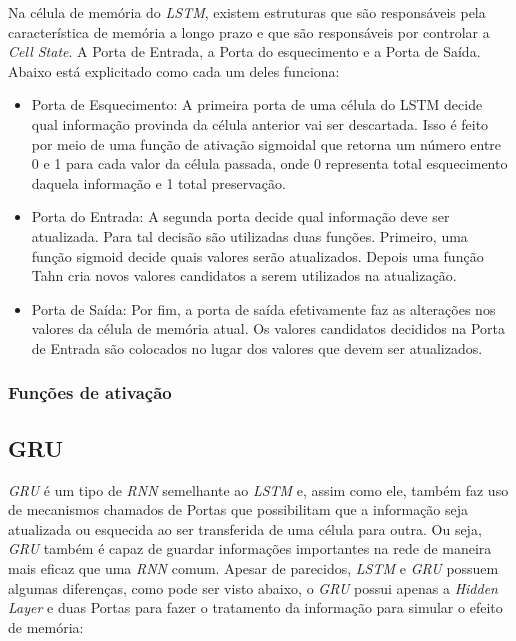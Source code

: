 Na célula de memória do \textit{\acrshort{LSTM}}, existem estruturas que são responsáveis pela característica de memória a longo prazo e que são responsáveis por controlar a \textit{Cell State}. A Porta de Entrada, a Porta do esquecimento e a Porta de Saída. Abaixo está explicitado como cada um deles funciona:
\begin{itemize}
  \item Porta de Esquecimento: A primeira porta de uma célula do \acrfull{LSTM} decide qual informação provinda da célula anterior vai ser descartada. Isso é feito por meio de uma função de ativação sigmoidal que retorna um número entre 0 e 1 para cada valor da célula passada, onde 0 representa total esquecimento daquela informação e 1 total preservação.
  
  \item Porta do Entrada: A segunda porta decide qual informação deve ser atualizada. Para tal decisão são utilizadas duas funções. Primeiro, uma função sigmoid decide quais valores serão atualizados. Depois uma função Tahn cria novos valores candidatos a serem utilizados na atualização.
  \item Porta de Saída: Por fim, a porta de saída efetivamente faz as alterações nos valores da célula de memória atual. Os valores candidatos decididos na Porta de Entrada são colocados no lugar dos valores que devem ser atualizados.
\end{itemize}


\subsubsection{Funções de ativação}

\subsection{\acrfull{GRU}}


\textit{\acrshort{GRU}} é um tipo de \textit{\acrshort{RNN}} semelhante ao \textit{\acrshort{LSTM}} e, assim como ele, também faz uso de mecanismos chamados de Portas que possibilitam que a informação seja atualizada ou esquecida ao ser transferida de uma célula para outra. Ou seja, \textit{\acrshort{GRU}} também é capaz de guardar informações importantes na rede de maneira mais eficaz que uma \textit{\acrshort{RNN}} comum. Apesar de parecidos, \textit{\acrshort{LSTM}} e \textit{\acrshort{GRU}} possuem algumas diferenças, como pode ser visto abaixo, o \textit{\acrshort{GRU}} possui apenas a \textit{Hidden Layer} e duas Portas para fazer o tratamento da informação para simular o efeito de memória:

